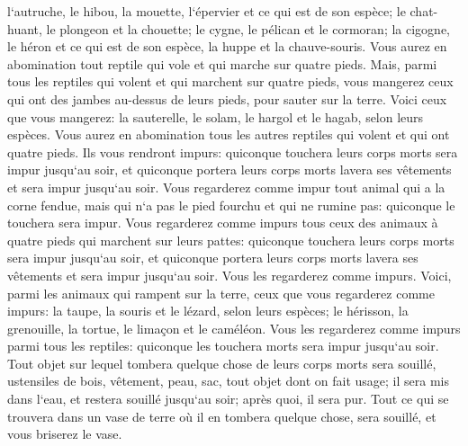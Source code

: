 \verse l`autruche, le hibou, la mouette, l`épervier et ce qui est de son espèce; 
\verse le chat-huant, le plongeon et la chouette; 
\verse le cygne, le pélican et le cormoran; 
\verse la cigogne, le héron et ce qui est de son espèce, la huppe et la chauve-souris. 
\verse Vous aurez en abomination tout reptile qui vole et qui marche sur quatre pieds. 
\verse Mais, parmi tous les reptiles qui volent et qui marchent sur quatre pieds, vous mangerez ceux qui ont des jambes au-dessus de leurs pieds, pour sauter sur la terre. 
\verse Voici ceux que vous mangerez: la sauterelle, le solam, le hargol et le hagab, selon leurs espèces. 
\verse Vous aurez en abomination tous les autres reptiles qui volent et qui ont quatre pieds. 
\verse Ils vous rendront impurs: quiconque touchera leurs corps morts sera impur jusqu`au soir, 
\verse et quiconque portera leurs corps morts lavera ses vêtements et sera impur jusqu`au soir. 
\verse Vous regarderez comme impur tout animal qui a la corne fendue, mais qui n`a pas le pied fourchu et qui ne rumine pas: quiconque le touchera sera impur. 
\verse Vous regarderez comme impurs tous ceux des animaux à quatre pieds qui marchent sur leurs pattes: quiconque touchera leurs corps morts sera impur jusqu`au soir, 
\verse et quiconque portera leurs corps morts lavera ses vêtements et sera impur jusqu`au soir. Vous les regarderez comme impurs. 
\verse Voici, parmi les animaux qui rampent sur la terre, ceux que vous regarderez comme impurs: la taupe, la souris et le lézard, selon leurs espèces; 
\verse le hérisson, la grenouille, la tortue, le limaçon et le caméléon. 
\verse Vous les regarderez comme impurs parmi tous les reptiles: quiconque les touchera morts sera impur jusqu`au soir. 
\verse Tout objet sur lequel tombera quelque chose de leurs corps morts sera souillé, ustensiles de bois, vêtement, peau, sac, tout objet dont on fait usage; il sera mis dans l`eau, et restera souillé jusqu`au soir; après quoi, il sera pur. 
\verse Tout ce qui se trouvera dans un vase de terre où il en tombera quelque chose, sera souillé, et vous briserez le vase. 
